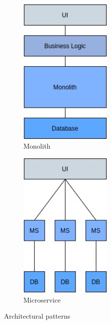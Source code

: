 \begin{figure}[t]
     \centering
     \begin{subfigure}[b]{0.49\textwidth}
         \centering
         \includegraphics[width=0.5\textwidth]{Chapters/img/2_background/monolith-architecture.jpg}
         \caption{Monolith}
         \label{fig:monolith-architecture}
     \end{subfigure}
     \hfill
     \begin{subfigure}[b]{0.49\textwidth}
         \centering
         \includegraphics[width=0.5\textwidth]{Chapters/img/2_background/microservices-architecture.jpg}
         \caption{Microservice}
         \label{fig:microservice-architecture}
     \end{subfigure}
     \caption{Architectural patterns}
\end{figure}



